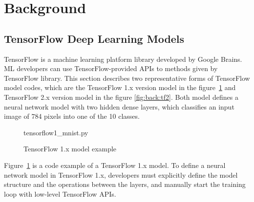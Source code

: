 \section{Background}\label{sec:background}
\subsection{TensorFlow Deep Learning Models}

TensorFlow\cite{tensorflow} is a machine learning platform library
developed by Google Brains.
ML developers can use TensorFlow-provided APIs to 
methods given by TensorFlow library.
This section describes two representative forms of TensorFlow
model codes, which are the TensorFlow 1.x version model 
in the figure~\ref{fig:back:tf1} and TensorFlow 2.x version model in the figure
\ref{fig:back:tf2}.
Both model defines a neural network model with two hidden dense layers,
which classifies an input image of 784 pixels into one of the 10 classes.

\begin{figure}[ht!]

{tensorflow1_mnist.py}
  \caption{TensorFlow 1.x model example}
\label{fig:back:tf1}
\end{figure}

Figure~\ref{fig:back:tf1} is a code example of a TensorFlow 1.x model.
To define a neural network model in TensorFlow 1.x, 
developers must explicitly define the model structure
and the operations between the layers, 
and manually start the training loop with low-level TensorFlow APIs.

